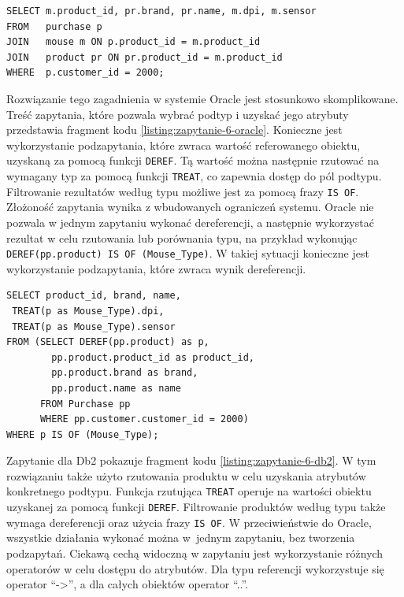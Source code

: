 \documentclass[a4paper,twoside,12pt]{book}
\begin{document}
\begin{lstlisting}[style=SQL, caption={Zapytanie szóste w podejściu relacyjnym.}, label={listing:zapytanie-6-rel}, captionpos=b]
SELECT m.product_id, pr.brand, pr.name, m.dpi, m.sensor
FROM   purchase p
JOIN   mouse m ON p.product_id = m.product_id
JOIN   product pr ON pr.product_id = m.product_id
WHERE  p.customer_id = 2000;
\end{lstlisting}

Rozwiązanie tego zagadnienia w systemie Oracle jest stosunkowo skomplikowane. Treść zapytania, które pozwala wybrać podtyp i uzyskać jego atrybuty przedstawia fragment kodu \ref{listing:zapytanie-6-oracle}. Konieczne jest wykorzystanie podzapytania, które zwraca wartość referowanego obiektu, uzyskaną za pomocą funkcji \lstinline{DEREF}. Tą wartość można następnie rzutować na wymagany typ za pomocą funkcji \lstinline{TREAT}, co zapewnia dostęp do pól podtypu. Filtrowanie rezultatów według typu możliwe jest za pomocą frazy \lstinline{IS OF}. Złożoność zapytania wynika z wbudowanych ograniczeń systemu. Oracle nie pozwala w jednym zapytaniu wykonać dereferencji, a następnie wykorzystać rezultat w celu rzutowania lub porównania typu, na przykład wykonując \lstinline{DEREF(pp.product) IS OF (Mouse_Type)}. W takiej sytuacji konieczne jest wykorzystanie podzapytania, które zwraca wynik dereferencji.

\begin{lstlisting}[style=SQL, caption={Zapytanie szóste w Oracle.}, label={listing:zapytanie-6-oracle}, captionpos=b]
SELECT product_id, brand, name, 
 TREAT(p as Mouse_Type).dpi, 
 TREAT(p as Mouse_Type).sensor 
FROM (SELECT DEREF(pp.product) as p, 
        pp.product.product_id as product_id, 
        pp.product.brand as brand, 
        pp.product.name as name
      FROM Purchase pp
      WHERE pp.customer.customer_id = 2000) 
WHERE p IS OF (Mouse_Type);
\end{lstlisting}

Zapytanie dla Db2 pokazuje fragment kodu \ref{listing:zapytanie-6-db2}. W tym rozwiązaniu także użyto rzutowania produktu w celu uzyskania atrybutów konkretnego podtypu. Funkcja rzutująca \lstinline{TREAT} operuje na wartości obiektu uzyskanej za pomocą funkcji \lstinline{DEREF}. Filtrowanie produktów według typu także wymaga dereferencji oraz użycia frazy \lstinline{IS OF}. W przeciwieństwie do Oracle, wszystkie działania wykonać można w~jednym zapytaniu, bez tworzenia podzapytań. Ciekawą cechą widoczną w zapytaniu jest wykorzystanie różnych operatorów w celu dostępu do atrybutów. Dla typu referencji wykorzystuje się operator ``->'', a dla całych obiektów operator ``..''.
\end{document}

